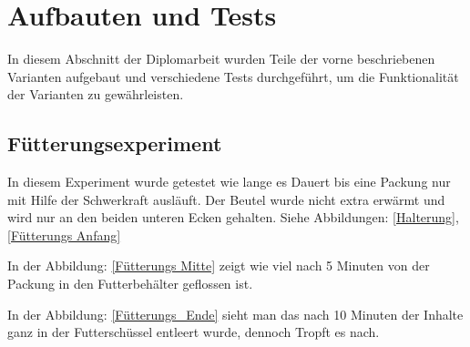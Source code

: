 \section{Aufbauten und Tests}

In diesem Abschnitt der Diplomarbeit wurden Teile der vorne beschriebenen Varianten aufgebaut und verschiedene Tests durchgeführt, um die Funktionalität der Varianten zu gewährleisten. \\

\subsection{Fütterungsexperiment} 

In diesem Experiment wurde getestet wie lange es Dauert bis eine Packung nur mit Hilfe der Schwerkraft ausläuft. Der Beutel wurde nicht extra erwärmt und wird nur an den beiden unteren Ecken gehalten. Siehe Abbildungen: \ref{Halterung}, \ref{Fütterungs Anfang} 

In der Abbildung: \ref{Fütterungs Mitte} zeigt wie viel nach 5 Minuten von der Packung in den Futterbehälter geflossen ist.

In der Abbildung: \ref{Fütterungs_Ende} sieht man das nach 10 Minuten der Inhalte ganz in der Futterschüssel entleert wurde, dennoch Tropft es nach.


